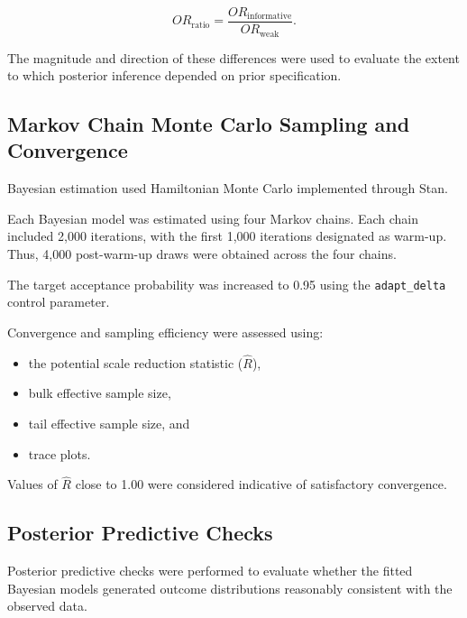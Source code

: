 \documentclass[12pt]{article}
\begin{document}
\[
OR_{\text{ratio}}
=
\frac{
OR_{\text{informative}}
}{
OR_{\text{weak}}
}.
\]

The magnitude and direction of these differences were used to evaluate the extent to which posterior inference depended on prior specification.


\subsection{Markov Chain Monte Carlo Sampling and Convergence}

Bayesian estimation used Hamiltonian Monte Carlo implemented through Stan.

Each Bayesian model was estimated using four Markov chains. Each chain included 2,000 iterations, with the first 1,000 iterations designated as warm-up. Thus, 4,000 post-warm-up draws were obtained across the four chains.

The target acceptance probability was increased to 0.95 using the \texttt{adapt\_delta} control parameter.

Convergence and sampling efficiency were assessed using:

\begin{itemize}
    \item the potential scale reduction statistic (\(\widehat{R}\)),
    \item bulk effective sample size,
    \item tail effective sample size, and
    \item trace plots.
\end{itemize}

Values of \(\widehat{R}\) close to 1.00 were considered indicative of satisfactory convergence.


\subsection{Posterior Predictive Checks}

Posterior predictive checks were performed to evaluate whether the fitted Bayesian models generated outcome distributions reasonably consistent with the observed data.
\end{document}
